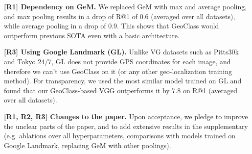 \documentclass[10pt,twocolumn,letterpaper]{article}
\newcommand{\RI}{{\color{red}\textbf{R1}}}
\newcommand{\RII}{{\color{ForestGreen}\textbf{R2}}}
\newcommand{\RIII}{{\color{blue}\textbf{R3}}}
\newcommand{\myparagraph}[1]{\vspace{-0.5pt}\noindent\textbf{#1}}
\begin{document}
\myparagraph{[{\RI}] Dependency on GeM.} 
We replaced GeM with max and average pooling, and max pooling results in a drop of R@1 of 0.6 (averaged over all datasets), while average pooling in a drop of 0.9. This shows that GeoClass would outperform previous SOTA even with a basic architecture.



\myparagraph{[{\RIII}] Using Google Landmark (GL).} 
Unlike VG datasets such as Pitts30k and Tokyo 24/7, GL does not provide GPS coordinates for each image, and therefore we can't use GeoClass on it (or any other geo-localization training method).
For transparency, we used the most similar model trained on GL
and found that our GeoClass-based VGG outperforms it by 7.8 on R@1 (averaged over all datasets).


\myparagraph{[{\RI, \RII, \RIII}] Changes to the paper.}
Upon acceptance, we pledge to improve the unclear parts of the paper, and to add extensive results in the supplementary (e.g. ablations over all hyperparameters, comparisons with models trained on Google Landmark, replacing GeM with other poolings).




\begin{table}[t!]
\centering
   \caption{\textbf{New ablations} to investigate the effect of the number of groups used for training (upper half), and different selections of groups (lower half) to train GeoClass. Results on Pitts30k val set.}
  \label{tab:new_ablations}
  \vspace{-0.4cm}
\end{table}
\end{document}
